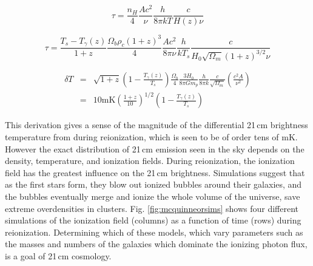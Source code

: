 \begin{equation}
\tau=\frac{n_H}{4}\frac{Ac^2}{\nu}\frac{h}{8\pi kT}\frac{c}{H(z)\nu}
\end{equation}

\begin{equation}
\tau=\frac{T_s-T_\gamma(z)}{1+z}\frac{\Omega_b\rho_c(1+z)^3}{4}\frac{Ac^2}{8\pi\nu}\frac{h}{kT_s}\frac{c}{H_0\sqrt{\Omega_m}(1+z)^{3/2}\nu}
\end{equation}

\begin{eqnarray}
\delta T&=&\sqrt{1+z}\left(1-\frac{T_\gamma(z)}{T_s}\right)\frac{\Omega_b}{4}\frac{3H_0}{8\pi Gm_p}\frac{h}{8\pi k}\frac{c}  {\sqrt{\Omega_m}}\left(\frac{c^2A}{\nu^2}\right)\\
&=&10\text{mK}\left(\frac{1+z}{10}\right)^{1/2}\left(1-\frac{T_\gamma(z)}{T_s}\right) 
\end{eqnarray}

This derivation gives a sense of the magnitude of the differential 21\,cm brightness temperature from during reionization, which is seen to be of order tens of mK. However the exact distribution of 21\,cm emission seen in the sky depends on the density, temperature, and ionization fields. During reionization, the ionization field has the greatest influence on the 21\,cm brightness. Simulations suggest that as the first stars form, they blow out ionized bubbles around their galaxies, and the bubbles eventually merge and ionize the whole volume of the universe, save extreme overdensities in clusters. Fig. \ref{fig:mcquinneorsims} shows four different simulations of the ionization field (columns) as a function of time (rows) during reionization. Determining which of these models, which vary parameters such as the masses and numbers of the galaxies which dominate the ionizing photon flux, is a goal of 21\,cm cosmology.

